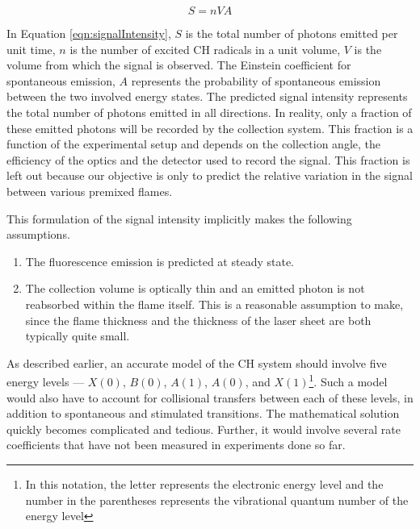 \begin{equation}
S=nVA
\label{eqn:signalIntensity}
\end{equation}

In Equation \ref{eqn:signalIntensity}, \(S\) is the total number of photons emitted per unit time, \(n\) is the number of excited CH radicals in a unit volume, \(V\) is the volume from which the signal is observed.
The Einstein coefficient for spontaneous emission, \(A\) represents the probability of spontaneous emission between the two involved energy states.
The predicted signal intensity represents the total number of photons emitted in all directions.
In reality, only a fraction of these emitted photons will be recorded by the collection system.
This fraction is a function of the experimental setup and depends on the collection angle, the efficiency of the optics and the detector used to record the signal.
This fraction is left out because our objective is only to predict the relative variation in the signal between various premixed flames.

This formulation of the signal intensity implicitly makes the following assumptions.
\begin{enumerate}
\item The fluorescence emission is predicted at steady state.
\item The collection volume is optically thin and an emitted photon is not reabsorbed within the flame itself.
This is a reasonable assumption to make, since the flame thickness and the thickness of the laser sheet are both typically quite small.
\end{enumerate}

As described earlier, an accurate model of the CH system should involve five energy levels --- \(X(0)\), \(B(0)\), \(A(1)\), \(A(0)\), and \(X(1)\)\footnote{In this notation, the letter represents the electronic energy level and the number in the parentheses represents the vibrational quantum number of the energy level}.
Such a model would also have to account for collisional transfers between each of these levels, in addition to spontaneous and stimulated transitions.
The mathematical solution quickly becomes complicated and tedious.
Further, it would involve several rate coefficients that have not been measured in experiments done so far.


